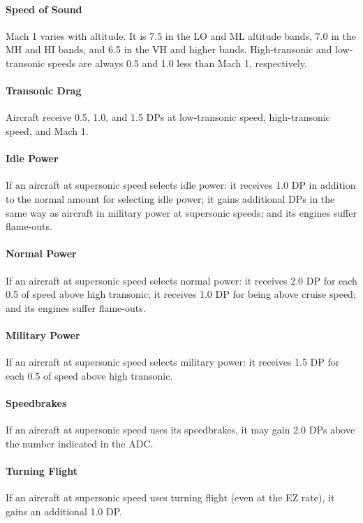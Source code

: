 \documentclass[10pt]{article}
\begin{document}
\paragraph{Speed of Sound} Mach 1 varies with altitude. It is 7.5 in the LO and ML altitude bands, 7.0 in the MH and HI bands, and 6.5 in the VH and higher bands. High-transonic and low-transonic speeds are always 0.5 and 1.0 less than Mach 1, respectively.

\paragraph{Transonic Drag} Aircraft receive 0.5, 1.0, and 1.5 DPs at low-transonic speed, high-transonic speed, and Mach 1.

\paragraph{Idle Power} If an aircraft at supersonic speed selects idle power: it receives 1.0 DP in addition to the normal amount for selecting idle power; it gains additional DPs in the same way as aircraft in military power at supersonic speeds; and its engines suffer flame-outs.

\paragraph{Normal Power} If an aircraft at supersonic speed selects normal power: it receives 2.0 DP for each 0.5 of speed above high transonic; it receives 1.0 DP for being above cruise speed; and its engines suffer flame-outs.

\paragraph{Military Power} If an aircraft at supersonic speed selects military power: it receives 1.5 DP for each 0.5 of speed above high transonic.

\paragraph{Speedbrakes} If an aircraft at supersonic speed uses its speedbrakes, it may gain 2.0 DPs above the number indicated in the ADC.

\paragraph{Turning Flight} If an aircraft at supersonic speed uses turning flight (even at the EZ rate), it gains an additional 1.0 DP.
\end{document}
